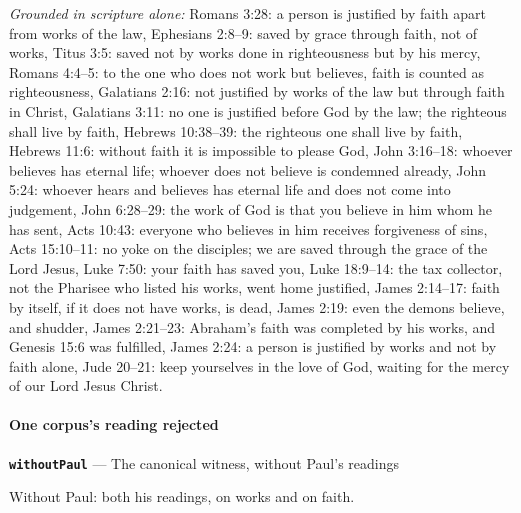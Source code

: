 \documentclass[11pt]{article}
\begin{document}
\emph{Grounded in scripture alone:} Romans 3:28: a person is justified by faith apart from works of the law, Ephesians 2:8–9: saved by grace through faith, not of works, Titus 3:5: saved not by works done in righteousness but by his mercy, Romans 4:4–5: to the one who does not work but believes, faith is counted as righteousness, Galatians 2:16: not justified by works of the law but through faith in Christ, Galatians 3:11: no one is justified before God by the law; the righteous shall live by faith, Hebrews 10:38–39: the righteous one shall live by faith, Hebrews 11:6: without faith it is impossible to please God, John 3:16–18: whoever believes has eternal life; whoever does not believe is condemned already, John 5:24: whoever hears and believes has eternal life and does not come into judgement, John 6:28–29: the work of God is that you believe in him whom he has sent, Acts 10:43: everyone who believes in him receives forgiveness of sins, Acts 15:10–11: no yoke on the disciples; we are saved through the grace of the Lord Jesus, Luke 7:50: your faith has saved you, Luke 18:9–14: the tax collector, not the Pharisee who listed his works, went home justified, James 2:14–17: faith by itself, if it does not have works, is dead, James 2:19: even the demons believe, and shudder, James 2:21–23: Abraham's faith was completed by his works, and Genesis 15:6 was fulfilled, James 2:24: a person is justified by works and not by faith alone, Jude 20–21: keep yourselves in the love of God, waiting for the mercy of our Lord Jesus Christ.
\paragraph*{One corpus's reading rejected}
\leavevmode\par
\par\medskip\noindent\textbf{\texttt{without\allowbreak{}Paul}} --- The canonical witness, without Paul's readings\par\nobreak\noindent
Without Paul: both his readings, on works and on faith.
\end{document}
